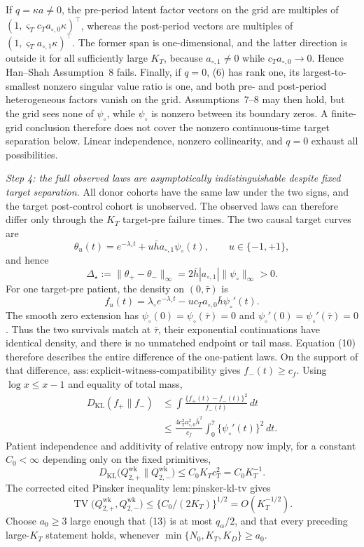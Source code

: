 If \(q=\kappa a\ne0\), the pre-period latent factor vectors on the grid
are multiples of
\((1,\varsigma_Tc_Ta_{\circ,0}\kappa)^\top\), whereas the post-period
vectors are multiples of
\((1,\varsigma_Ta_{\circ,1}\kappa)^\top\).  The former span is
one-dimensional, and the latter direction is outside it for all
sufficiently large \(K_T\), because \(a_{\circ,1}\ne0\) while
\(c_Ta_{\circ,0}\to0\).  Hence Han--Shah Assumption~8 fails.  Finally,
if \(q=0\), (6) has rank one, its largest-to-smallest nonzero singular
value ratio is one, and both pre- and post-period heterogeneous factors
vanish on the grid.  Assumptions~7--8 may then hold, but the grid sees none
of \(\psi_\circ\), while \(\psi_\circ\) is nonzero between its boundary
zeros.  A finite-grid conclusion therefore does not cover the nonzero
continuous-time target separation below.  Linear independence,
nonzero collinearity, and \(q=0\) exhaust all possibilities.

\emph{Step 4: the full observed laws are asymptotically indistinguishable
despite fixed target separation.}
All donor cohorts have the same law under the two signs, and the target
post-control cohort is unobserved.  The observed laws can therefore differ
only through the \(K_T\) target-pre failure times.  The two causal target
curves are
\[
 \theta_u(t)=e^{-\lambda_\circ t}
             +u\bar h a_{\circ,1}\psi_\circ(t),
 \qquad u\in\{-1,+1\},
\]
and hence
\[
 \Delta_\star:=\|\theta_+-\theta_-\|_\infty
 =2\bar h|a_{\circ,1}|\|\psi_\circ\|_\infty>0.       \tag{9}
\]
For one target-pre patient, the density on \((0,\bar\tau)\) is
\[
 f_u(t)=\lambda_\circ e^{-\lambda_\circ t}
       -u c_Ta_{\circ,0}\bar h\psi_\circ'(t).         \tag{10}
\]
The smooth zero extension has
\(\psi_\circ(0)=\psi_\circ(\bar\tau)=0\) and
\(\psi_\circ'(0)=\psi_\circ'(\bar\tau)=0\).  Thus the two survivals
match at \(\bar\tau\), their exponential continuations have identical
density, and there is no unmatched endpoint or tail mass.  Equation (10)
therefore describes the entire difference of the one-patient laws.  On
the support of that difference,
\(\mathrm{ass:explicit\mbox{-}witness\mbox{-}compatibility}\) gives
\(f_-(t)\ge c_f\).  Using \(\log x\le x-1\) and equality of total mass,
\[
 \begin{aligned}
 D_{\mathrm{KL}}(f_+\|f_-)
 &\le \int\frac{\{f_+(t)-f_-(t)\}^2}{f_-(t)}\,dt\\
 &\le \frac{4c_T^2a_{\circ,0}^2\bar h^2}{c_f}
       \int_0^{\bar\tau}\{\psi_\circ'(t)\}^2\,dt.
 \end{aligned}                                                       \tag{11}
\]
Patient independence and additivity of relative entropy now imply, for a
constant \(C_0<\infty\) depending only on the fixed primitives,
\[
 D_{\mathrm{KL}}
 \bigl(Q_{2,+}^{\mathrm{wk}}\|Q_{2,-}^{\mathrm{wk}}\bigr)
 \le C_0K_Tc_T^2=C_0K_T^{-1}.                         \tag{12}
\]
The corrected cited Pinsker inequality
\(\mathrm{lem:pinsker\mbox{-}kl\mbox{-}tv}\) gives
\[
 \operatorname{TV}
 \bigl(Q_{2,+}^{\mathrm{wk}},Q_{2,-}^{\mathrm{wk}}\bigr)
 \le\{C_0/(2K_T)\}^{1/2}=O(K_T^{-1/2}).              \tag{13}
\]
Choose \(a_0\ge3\) large enough that (13) is at most \(q_\alpha/2\),
and that every preceding large-\(K_T\) statement holds, whenever
\(\min\{N_0,K_T,K_D\}\ge a_0\).

